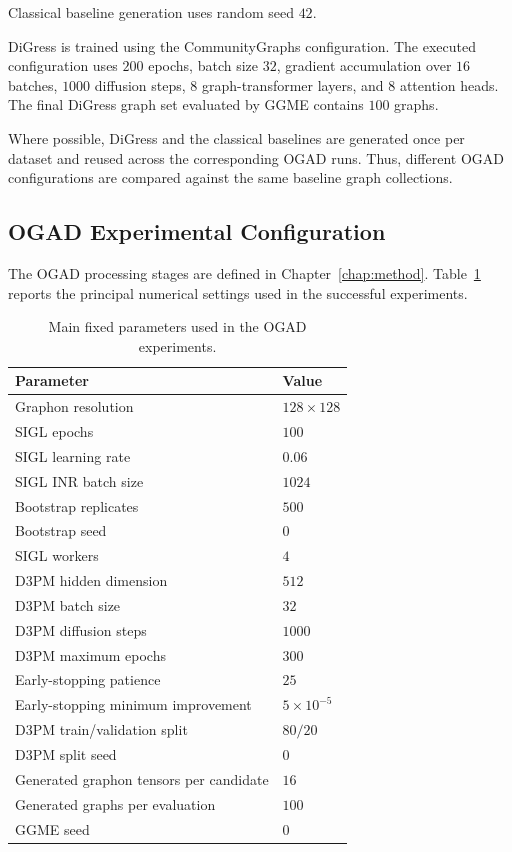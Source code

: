 Classical baseline generation uses random seed \(42\).

DiGress is trained using the CommunityGraphs configuration. The executed configuration uses \(200\) epochs, batch size \(32\), gradient accumulation over \(16\) batches, \(1000\) diffusion steps, \(8\) graph-transformer layers, and \(8\) attention heads. The final DiGress graph set evaluated by GGME contains \(100\) graphs.

Where possible, DiGress and the classical baselines are generated once per dataset and reused across the corresponding OGAD runs. Thus, different OGAD configurations are compared against the same baseline graph collections.


\subsection{OGAD Experimental Configuration}
\label{subsec:exp_ogad_configuration}

The OGAD processing stages are defined in Chapter~\ref{chap:method}. Table~\ref{tab:exp_fixed_parameters} reports the principal numerical settings used in the successful experiments.

\begin{table}[htbp]
    \centering
    \caption{Main fixed parameters used in the OGAD experiments.}
    \label{tab:exp_fixed_parameters}
    \begin{tabular}{ll}
        \hline
        Parameter & Value \\
        \hline
        Graphon resolution & \(128\times128\) \\
        SIGL epochs & \(100\) \\
        SIGL learning rate & \(0.06\) \\
        SIGL INR batch size & \(1024\) \\
        Bootstrap replicates & \(500\) \\
        Bootstrap seed & \(0\) \\
        SIGL workers & \(4\) \\
        D3PM hidden dimension & \(512\) \\
        D3PM batch size & \(32\) \\
        D3PM diffusion steps & \(1000\) \\
        D3PM maximum epochs & \(300\) \\
        Early-stopping patience & \(25\) \\
        Early-stopping minimum improvement & \(5\times10^{-5}\) \\
        D3PM train/validation split & \(80/20\) \\
        D3PM split seed & \(0\) \\
        Generated graphon tensors per candidate & \(16\) \\
        Generated graphs per evaluation & \(100\) \\
        GGME seed & \(0\) \\
        \hline
    \end{tabular}
\end{table}

